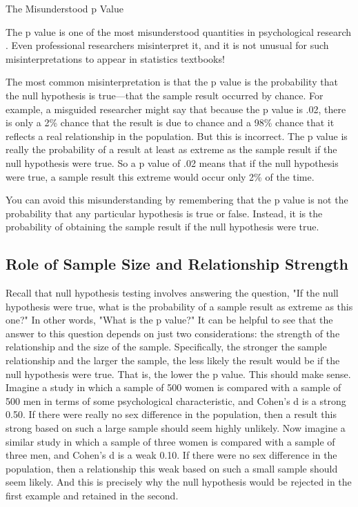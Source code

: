 The Misunderstood p Value


The p value is one of the most misunderstood quantities in psychological research \citep{cohen_world_1994}. Even professional researchers misinterpret it, and it is not unusual for such misinterpretations to appear in statistics textbooks!


The most common misinterpretation is that the p value is the probability that the null hypothesis is true---that the sample result occurred by chance. For example, a misguided researcher might say that because the p value is .02, there is only a 2\% chance that the result is due to chance and a 98\% chance that it reflects a real relationship in the population. But this is incorrect. The p value is really the probability of a result at least as extreme as the sample result if the null hypothesis were true. So a p value of .02 means that if the null hypothesis were true, a sample result this extreme would occur only 2\% of the time.


You can avoid this misunderstanding by remembering that the p value is not the probability that any particular hypothesis is true or false. Instead, it is the probability of obtaining the sample result if the null hypothesis were true.



\subsection{Role of Sample Size and Relationship Strength}




Recall that null hypothesis testing involves answering the question, "If the null hypothesis were true, what is the probability of a sample result as extreme as this one?" In other words, "What is the p value?" It can be helpful to see that the answer to this question depends on just two considerations: the strength of the relationship and the size
of the sample. Specifically, the stronger the sample relationship and the larger the sample, the less likely the result would be if the null hypothesis were true. That is, the lower the p value. This should make sense. Imagine a study in which a sample of 500 women is compared with a sample of 500 men in terms of some psychological characteristic, and Cohen's d is a strong 0.50. If there were really no sex difference in the population, then a result this strong based on such a large sample should seem highly unlikely. Now imagine a similar study in which a sample of three women is compared with a sample of three men, and Cohen's d is a weak 0.10. If there were no sex difference in the population, then a relationship this weak based on such a small sample should seem likely. And this is precisely why the null hypothesis would be rejected in the first example and retained in the second.





